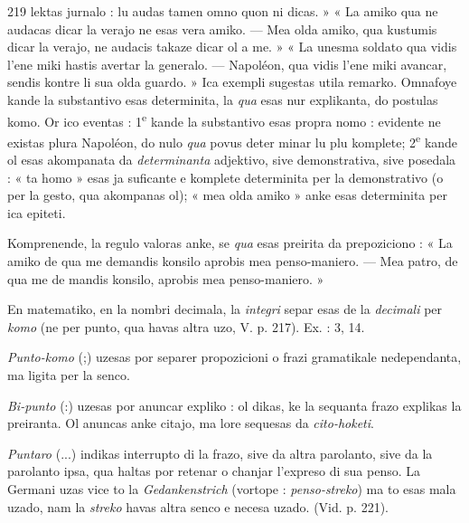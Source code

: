 \begin{VUpage}[223]{219}
\VUcontinue
lektas jurnalo : lu audas tamen omno quon ni dicas. » « La\nl
amiko qua ne audacas dicar la verajo ne esas vera amiko. ---\nl
Mea olda amiko, qua kustumis dicar la verajo, ne audacis\nl
takaze dicar ol a me. » « La unesma soldato qua vidis l'ene\cc
miki hastis avertar la generalo. --- Napoléon, qua vidis l'ene\cc
miki avancar, sendis kontre li sua olda guardo. » Ica exempli\nl
sugestas utila remarko. Omnafoye kande la substantivo esas\nl
determinita, la \textit{qua} esas nur explikanta, do postulas komo.\nl
Or ico eventas : 1\textsuperscript{e} kande la substantivo esas propra nomo :\nl
evidente ne existas plura Napoléon, do nulo \textit{qua} povus deter\cc
minar lu plu komplete; 2\textsuperscript{e} kande ol esas akompanata da\nl
\textit{determinanta} adjektivo, sive demonstrativa, sive posedala :\nl
« ta homo » esas ja suficante e komplete determinita per\nl
la demonstrativo (o per la gesto, qua akompanas ol); « mea\nl
olda amiko » anke esas determinita per ica epiteti.

Komprenende, la regulo valoras anke, se \textit{qua} esas preirita\nl
da prepoziciono : « La amiko de qua me demandis konsilo\nl
aprobis mea penso-maniero. --- Mea patro, de qua me de\cc
mandis konsilo, aprobis mea penso-maniero. »

En matematiko, en la nombri decimala, la \textit{integri} separ\cc
esas de la \textit{decimali} per \textit{komo} (ne per punto, qua havas altra\nl
uzo, V. p. 217). Ex. : 3, 14.

\textit{Punto-komo} (;) uzesas por separer propozicioni o frazi\nl
gramatikale nedependanta, ma ligita per la senco.

\textit{Bi-punto} (:) uzesas por anuncar expliko : ol dikas, ke\nl
la sequanta frazo explikas la preiranta. Ol anuncas anke\nl
citajo, ma lore sequesas da \textit{cito-hoketi}.

\textit{Puntaro} (...) indikas interrupto di la frazo, sive da altra\nl
parolanto, sive da la parolanto ipsa, qua haltas por retenar\nl
o chanjar l'expreso di sua penso. La Germani uzas vice to\nl
la \textit{Gedankenstrich} (vortope : \textit{penso-streko}) ma to esas mala\nl
uzado, nam la \textit{streko} havas altra senco e necesa uzado. (Vid.\nl
p. 221).


\end{VUpage}
